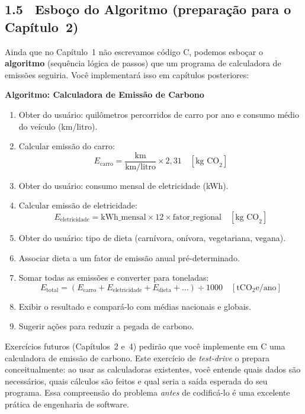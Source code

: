 \documentclass[12pt,a4paper]{article}
\begin{document}
\bigskip

\subsection*{1.5 \ Esboço do Algoritmo (preparação para o Capítulo~2)}

Ainda que no Capítulo~1 não escrevamos código C, podemos esboçar o \textbf{algoritmo}
(sequência lógica de passos) que um programa de calculadora de emissões seguiria.
Você implementará isso em capítulos posteriores:

\begin{algoritmo}
\textbf{Algoritmo: Calculadora de Emissão de Carbono}

\begin{enumerate}
  \item Obter do usuário: quilômetros percorridos de carro por ano e consumo médio
  do veículo (km/litro).
  \item Calcular emissão do carro:
  \[
    E_{\text{carro}} = \frac{\text{km}}{\text{km/litro}} \times 2{,}31
    \quad [\text{kg CO}_2]
  \]
  \item Obter do usuário: consumo mensal de eletricidade (kWh).
  \item Calcular emissão de eletricidade:
  \[
    E_{\text{eletricidade}} = \text{kWh\_mensal} \times 12 \times \text{fator\_regional}
    \quad [\text{kg CO}_2]
  \]
  \item Obter do usuário: tipo de dieta (carnívora, onívora, vegetariana, vegana).
  \item Associar dieta a um fator de emissão anual pré-determinado.
  \item Somar todas as emissões e converter para toneladas:
  \[
    E_{\text{total}} = (E_{\text{carro}} + E_{\text{eletricidade}} + E_{\text{dieta}} + \ldots)
    \div 1000 \quad [\text{tCO}_2\text{e/ano}]
  \]
  \item Exibir o resultado e compará-lo com médias nacionais e globais.
  \item Sugerir ações para reduzir a pegada de carbono.
\end{enumerate}
\end{algoritmo}

\begin{boaprática}
  Exercícios futuros (Capítulos~2 e~4) pedirão que você implemente em C uma
  calculadora de emissão de carbono. Este exercício de \textit{test-drive} o
  prepara conceitualmente: ao usar as calculadoras existentes, você entende
  quais dados são necessários, quais cálculos são feitos e qual seria a saída
  esperada do seu programa. Essa compreensão do problema \textit{antes} de
  codificá-lo é uma excelente prática de engenharia de software.
\end{boaprática}
\end{document}

